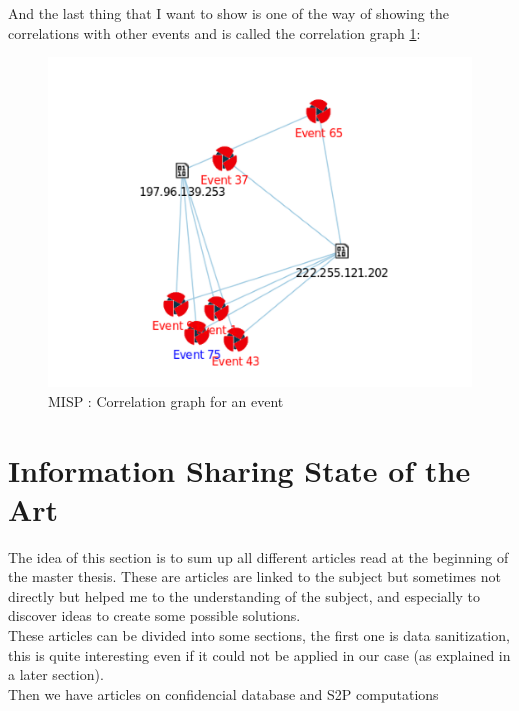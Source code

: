 \documentclass{eplmastersthesis}
\begin{document}
And the last thing that I want to show is one of the way of showing the correlations with other events and is called the correlation graph \ref{webcorrelation}:
\begin{figure}[!h]
	\begin{center}
		\includegraphics[scale=0.35]{res/webCorrelationGraph}
		\caption{MISP : Correlation graph for an event}
		\label{webcorrelation}
	\end{center}
\end{figure}



\section{Information Sharing State of the Art}
The idea of this section is to sum up all different articles read at the beginning of the master thesis. These are articles are linked to the subject but sometimes not directly but helped me to the understanding of the subject, and especially to discover ideas to create some possible solutions.\\
These articles can be divided into some sections, the first one is data sanitization, this is quite interesting even if it could not be applied in our case (as explained in a later section).\\
Then we have articles on confidencial database and S2P computations 
\end{document}
